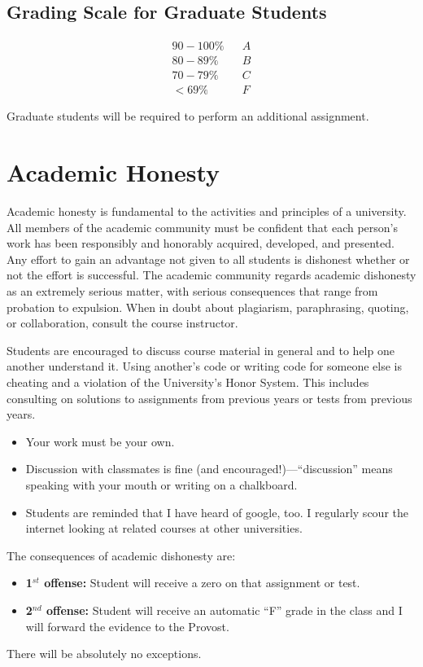 \documentclass[11pt]{article}
\begin{document}
\subsection*{Grading Scale for Graduate Students} 

\[
\begin{array}{lcl}
90-100\%	&&A\\
80-89\%	&&B\\
70-79\%	&&C\\
< 69\%	&&F
\end{array}
\]

Graduate students will be required to perform an additional assignment.

\section{Academic Honesty	}

Academic honesty is fundamental to the activities and principles of a university. All members of the academic community must be confident that each person's work has been responsibly and honorably acquired, developed, and presented. Any effort to gain an advantage not given to all students is dishonest whether or not the effort is successful. The academic community regards academic dishonesty as an extremely serious matter, with serious consequences that range from probation to expulsion. When in doubt about plagiarism, paraphrasing, quoting, or collaboration, consult the course instructor. 
	
	Students are encouraged to discuss course material in general and to help one another understand it. Using another's code or writing code for someone else is cheating and a violation of the University's Honor System. This includes consulting on solutions to assignments from previous years or tests from previous years. 
\begin{itemize}
\item Your work must be your own. 
\item Discussion with classmates is fine (and encouraged!)---``discussion'' means speaking with your mouth or writing on a chalkboard.
\item Students are reminded that I have heard of google, too. I regularly scour the internet looking at related courses at other universities.
\end{itemize}

The consequences of academic dishonesty are:
\begin{itemize}
\item[] {\bf 1$^{st}$ offense:} Student will receive a zero on that assignment or test.
\item[] {\bf 2$^{nd}$ offense:} Student will receive an automatic “F” grade in the class and I will forward the evidence to the Provost.
\end{itemize}
There will be absolutely no exceptions.
\end{document}
